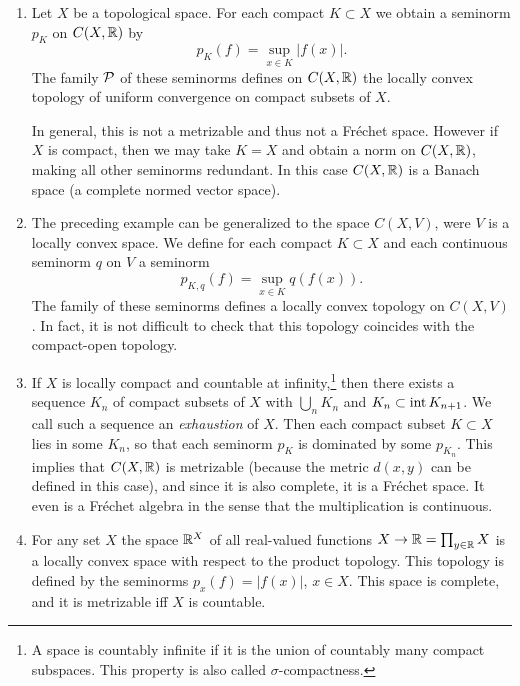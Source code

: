 \begin{example}
    \begin{enumerate}[label=(\alph*)]
        \item Let $X$ be a topological space. For each compact $K\subset X$ we obtain a seminorm $p_K$ on $C(X,\mathbb{R})$ by
        \[p_K(f)=\sup_{x\in K}|f(x)|.\]
        The family $\mathcal{P}$ of these seminorms defines on $C(X,\mathbb{R})$ the locally convex topology of uniform convergence on compact subsets of $X$. 
        
        In general, this is not a metrizable and thus not a Fr\'echet space. However if $X$ is compact, then we may take $K=X$ and obtain a norm on $C(X,\mathbb{R})$, making all other seminorms redundant. In this case $C(X,\mathbb{R})$ is a Banach space (a complete normed vector space).
        \item The preceding example can be generalized to the space $C(X,V)$, were $V$ is a locally convex space. We define for each compact $K\subset X$ and each continuous seminorm $q$ on $V$ a seminorm
        \[p_{K,q}(f)=\sup_{x\in K} q(f(x)).\]
        The family of these seminorms defines a locally convex topology on $C(X,V)$. In fact, it is not difficult to check that this topology coincides with the compact-open topology.
        \item If $X$ is locally compact and countable at infinity,\footnote{A space is countably infinite if it is the union of countably many compact subspaces. This property is also called $\sigma$-compactness.} then there exists a sequence $K_n$ of compact subsets of $X$ with $\bigcup_n K_n$ and $K_n\subset \operatorname{int} K_{n+1}$. We call such a sequence an \emph{exhaustion} of $X$. Then each compact subset $K\subset X$ lies in some $K_n$, so that each seminorm $p_K$ is dominated by some $p_{K_n}$. This implies that $C(X,\mathbb{R})$ is metrizable (because the metric $d(x,y)$ can be defined in this case), and since it is also complete, it is a Fr\'echet space. It even is a Fr\'echet algebra in the sense that the multiplication is continuous.
        \item For any set $X$ the space $\mathbb{R}^X$ of all real-valued functions $X\to \mathbb{R}=\prod_{y\in \mathbb{R}} X$ is a locally convex space with respect to the product topology. This topology is defined by the seminorms $p_x(f)=|f(x)|$, $x\in X$. This space is complete, and it is metrizable iff $X$ is countable.
    \end{enumerate}
\end{example}

